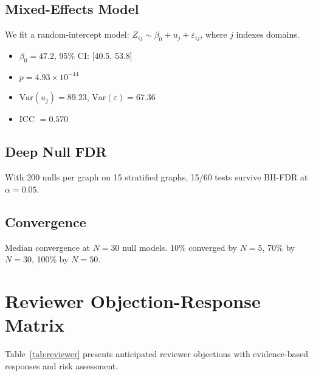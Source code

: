 \documentclass[11pt,a4paper]{article}
\begin{document}
\subsection{Mixed-Effects Model}
We fit a random-intercept model: $Z_{ij} \sim \beta_0 + u_j + \varepsilon_{ij}$, where $j$ indexes domains.
\begin{itemize}
\item $\beta_0 = 47.2$, 95\% CI: [40.5, 53.8]
\item $p = 4.93 \times 10^{-44}$
\item $\mathrm{Var}(u_j) = 89.23$, $\mathrm{Var}(\varepsilon) = 67.36$
\item ICC $= 0.570$
\end{itemize}

\subsection{Deep Null FDR}
With 200 nulls per graph on 15 stratified graphs, 15/60 tests survive BH-FDR at $\alpha = 0.05$.

\subsection{Convergence}
Median convergence at $N = 30$ null models. 10\% converged by $N=5$, 70\% by $N=30$, 100\% by $N=50$.


\section{Reviewer Objection-Response Matrix}
Table~\ref{tab:reviewer} presents anticipated reviewer objections with evidence-based responses and risk assessment.
\end{document}

